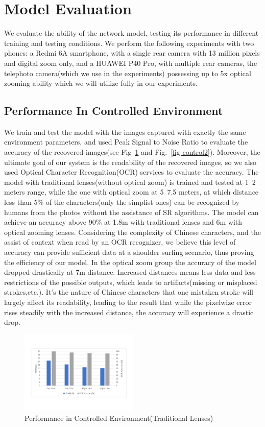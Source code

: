  
\section{Model Evaluation}
We evaluate the ability of the network model, testing its performance in different training and testing conditions. We perform the following experiments with two phones: a Redmi 6A smartphone, with a single rear camera with 13 million pixels and digital zoom only, and a HUAWEI P40 Pro, with multiple rear cameras, the telephoto camera(which we use in the experiments) possessing up to 5x optical zooming ability which we will utilize fully in our experiments. 
\subsection{Performance In Controlled Environment}
We train and test the model with the images captured with exactly the same environment parameters, and used Peak Signal to Noise Ratio to evaluate the accuracy of the recovered images(see Fig~\ref{fig-control} and Fig.~\ref{fig-control2}). Moreover, the ultimate goal of our system is the readability of the recovered images, so we also used Optical Character Recognition(OCR) services to evaluate the accuracy. The model with traditional lenses(without optical zoom) is trained and tested at 1~2 meters range, while the one with optical zoom at 5~7.5 meters, at which distance less than 5\% of the characters(only the simplist ones) can be recognized by humans from the photos without the assistance of SR algorithms. The model can achieve an accuracy above 90\% at 1.8m with traditional lenses and 6m with optical zooming lenses. Considering the complexity of Chinese characters, and the assist of context when read by an OCR recognizer, we believe this level of accuracy can provide sufficient data at a shoulder surfing scenario, thus proving the efficiency of our model.
In the optical zoom group the accuracy of the model dropped drastically at 7m distance. Increased distances means less data and less restrictions of the possible outputs, which leads to artifacts(missing or misplaced strokes,etc.). It's the nature of Chinese characters that one mistaken stroke will largely affect its readability, leading to the result that while the pixelwize error rises steadily with the increased distance, the accuracy will experience a drastic drop.

\begin{figure}
 \centering
    \includegraphics[width=0.5\textwidth]{./pic/table1.pdf}
    \caption{Performance in Controlled Environment(Traditional Lenses)}
    \label{fig-control}
\end{figure}

